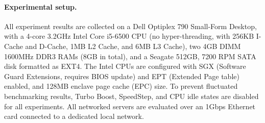 


\paragraph{Experimental setup.}

All experiment results are collected on a Dell Optiplex 790 Small-Form Desktop,
with a 4-core 3.2GHz Intel Core i5-6500 CPU (no hyper-threading, with 256KB I-Cache and D-Cache, 1MB L2 Cache, and 6MB L3 Cache),
two 4GB DIMM 1600MHz DDR3 RAMs (8GB in total), and a Seagate 512GB, 7200 RPM SATA disk formatted as EXT4.
The Intel CPUs are configured with SGX (Software Guard Extensions, requires BIOS update) and EPT (Extended Page table) enabled, and 128MB enclave page cache (EPC) size.
To prevent fluctuated benchmarking results,
Turbo Boost, SpeedStep, and CPU idle states are disabled for
all experiments.
All networked servers are evaluated over an 1Gbps Ethernet card connected to a dedicated local network.



